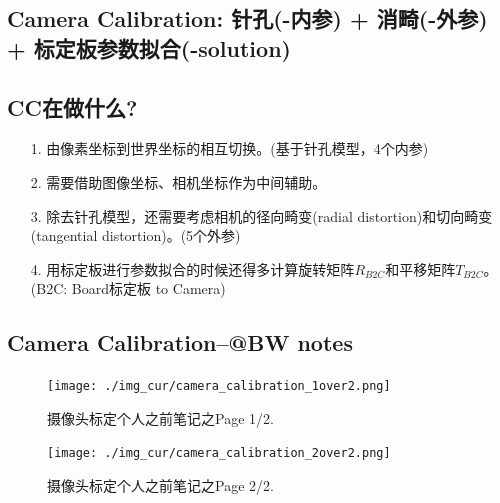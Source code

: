 \documentclass{article}
\begin{document}
\begin{CJK}{UTF8}{gkai}  
\section{Camera Calibration: 针孔(-内参) + 消畸(-外参) + 标定板参数拟合(-solution)}
\label{sec:previous_notes_on_cc_BW}
	
\subsection{CC在做什么?}	
	\begin{itemize}
		\item [1.] 由像素坐标到世界坐标的相互切换。(基于针孔模型，4个内参)
		\item [2.] 需要借助图像坐标、相机坐标作为中间辅助。
		\item [3.] 除去针孔模型，还需要考虑相机的径向畸变(radial distortion)和切向畸变(tangential distortion)。(5个外参)
		\item [4.] 用标定板进行参数拟合的时候还得多计算旋转矩阵$R_{B2C}$和平移矩阵$T_{B2C}$。(B2C: Board标定板 to Camera)
	\end{itemize}
	
\subsection{Camera Calibration--@BW notes}	
\label{ssec: camera_calibration_notes_BW}
	\begin{figure}[!t]
		\centering
		\texttt{[image: ./img\_cur/camera\_calibration\_1over2.png]}
		\caption{摄像头标定个人之前笔记之Page 1/2.}
		\vspace{-1.0em}
		\label{fig_CameraCalibration_1over2_BW}
	\end{figure}

	\begin{figure}[!t]
		\centering
		\texttt{[image: ./img\_cur/camera\_calibration\_2over2.png]} 
		\caption{摄像头标定个人之前笔记之Page 2/2.}
		\vspace{-1.0em}
		\label{fig_CameraCalibration_2over2_BW}
	\end{figure}
\end{CJK}

\end{document}
